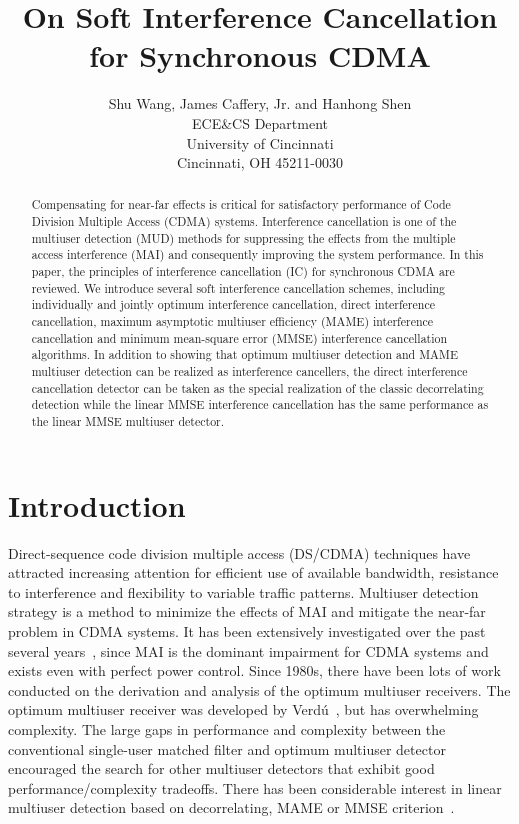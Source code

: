 \documentclass[a4paper,12pt,fleqn]{article}
\title{ On Soft Interference Cancellation for Synchronous CDMA}
\date{}
\author{ Shu Wang, James Caffery, Jr. and Hanhong Shen\\ ECE\&CS Department\\ University of Cincinnati \\Cincinnati, OH 45211-0030}
\begin{document}
\maketitle

\begin{abstract}
Compensating for near-far effects is critical for satisfactory
performance of Code Division Multiple Access (CDMA) systems.
Interference cancellation is one of the multiuser detection (MUD)
methods for suppressing the effects from the multiple access
interference (MAI) and consequently improving the system
performance. In this paper, the principles of interference
cancellation (IC) for synchronous CDMA are reviewed. We introduce
several soft interference cancellation schemes, including
individually and jointly optimum interference cancellation, direct
interference cancellation, maximum asymptotic multiuser efficiency
(MAME) interference cancellation and minimum mean-square error
(MMSE) interference cancellation algorithms. In addition to
showing that optimum multiuser detection and MAME multiuser
detection can be realized as interference cancellers, the direct
interference cancellation detector can be taken as the special
realization of the classic decorrelating detection while the
linear MMSE interference cancellation has the same performance as
the linear MMSE multiuser detector.
\end{abstract}

\section{Introduction}

Direct-sequence code division multiple access (DS/CDMA) techniques
have attracted increasing attention for efficient use of available
bandwidth, resistance to interference and flexibility to variable
traffic patterns. Multiuser detection strategy is a method to
minimize the effects of MAI and mitigate the near-far problem in
CDMA systems. It has been extensively investigated over the past
several years~\cite{Verd98}, since MAI is the dominant impairment
for CDMA systems and exists even with perfect power control. Since
1980s, there have been lots of work conducted on the derivation
and analysis of the optimum multiuser receivers. The optimum
multiuser receiver was developed by
Verd\'{u}~\cite{Verd83a,Verd83b,Verd84}, but has overwhelming
complexity. The large gaps in performance and complexity between
the conventional single-user matched filter and optimum multiuser
detector encouraged the search for other multiuser detectors that
exhibit good performance/complexity tradeoffs. There has been
considerable interest in linear multiuser detection based on
decorrelating, MAME or MMSE
criterion~\cite{Lupa89,Lupa90,Madhow94}.
\end{document}
